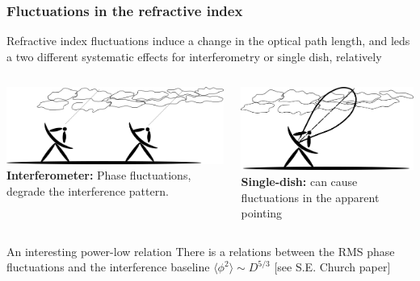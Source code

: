 \documentclass[aspectratio=169]{beamer}
\begin{document}
\begin{frame}
    \frametitle{Fluctuations in the refractive index}
    Refractive index fluctuations induce a change in the optical path length, and leds a two different systematic effects for interferometry or single dish, relatively
    \begin{columns}
        \begin{column}{0.55\textwidth}
            \centering
            \includegraphics[scale=0.4]{path32.png}
            \textbf{Interferometer:} Phase fluctuations, degrade the interference pattern.
        \end{column}
        \begin{column}{0.45\textwidth}
            \centering
            \includegraphics[scale=0.4]{path33.png}
            \textbf{Single-dish:} can cause fluctuations in the apparent pointing
        \end{column}

    \end{columns}
    \begin{alertblock}{An interesting power-low relation}
        There is a relations between the RMS phase fluctuations and the interference baseline $\langle\phi^2\rangle \sim D ^{5/3}$ [see S.E. Church paper]
    \end{alertblock}
\end{frame}
\end{document}
